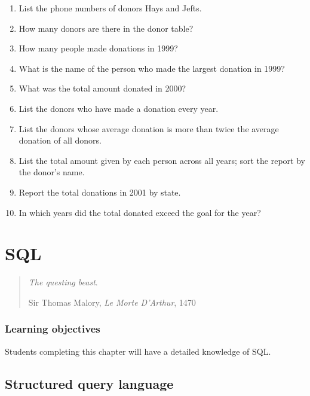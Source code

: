 \documentclass[
]{article}
\begin{document}
\begin{enumerate}
  \begin{enumerate}
  \def\labelenumii{\alph{enumii}.}
  \item
    List the phone numbers of donors Hays and Jefts.
  \item
    How many donors are there in the donor table?
  \item
    How many people made donations in 1999?
  \item
    What is the name of the person who made the largest donation in
    1999?
  \item
    What was the total amount donated in 2000?
  \item
    List the donors who have made a donation every year.
  \item
    List the donors whose average donation is more than twice the
    average donation of all donors.
  \item
    List the total amount given by each person across all years; sort
    the report by the donor's name.
  \item
    Report the total donations in 2001 by state.
  \item
    In which years did the total donated exceed the goal for the year?
  \end{enumerate}
\end{enumerate}

\hypertarget{sql}{%
\section{SQL}\label{sql}}

\begin{quote}
\emph{The questing beast}.

Sir Thomas Malory, \emph{Le Morte D'Arthur}, 1470
\end{quote}

\hypertarget{learning-objectives-3}{%
\subsubsection*{Learning objectives}\label{learning-objectives-3}}

Students completing this chapter will have a detailed knowledge of SQL.

\hypertarget{structured-query-language}{%
\subsection*{Structured query
language}\label{structured-query-language}}
\end{document}
